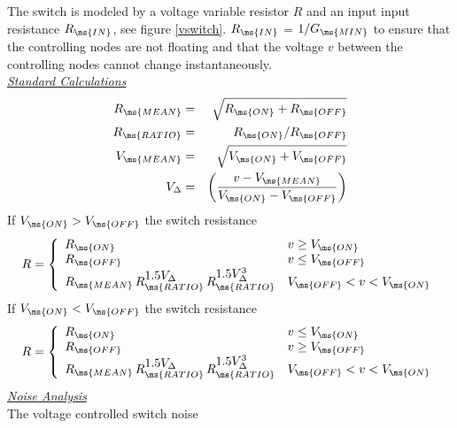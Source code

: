 The switch is modeled by a voltage variable resistor $R$ and an
input input resistance $R_{\ms{IN}}$, see figure \ref{vswitch}.
$R_{\ms{IN}}$ = $1/G_{\ms{MIN}}$ to ensure that the controlling
nodes are not floating and that the voltage $v$ between the
controlling nodes cannot change instantaneously.\\[0.1in]

\noindent\underline{\sl \large Standard Calculations}\\[0.1in]
\begin{eqnarray}
R_{\ms{MEAN}} & = & \sqrt{R_{\ms{ON}} + R_{\ms{OFF}}} \\
R_{\ms{RATIO}}& = &       R_{\ms{ON}}/ R_{\ms{OFF}} \\
V_{\ms{MEAN}} & = & \sqrt{V_{\ms{ON}} + V_{\ms{OFF}}} \\
V_{\Delta}& = & \left({{\textstyle v - V_{\ms{MEAN}}} \over
              {\textstyle V_{\ms{ON}}- V_{\ms{OFF}}}}\right)
\end{eqnarray}
If $V_{\ms{ON}}> V_{\ms{OFF}}$ the switch resistance
\begin{equation}
R = \left\{
\begin{array}{ll}
R_{\ms{ON}}                            & v \ge V_{\ms{ON}} \\
R_{\ms{OFF}}                            & v \le V_{\ms{OFF}}\\
R_{\ms{MEAN}}\,
  R_{\ms{RATIO}}^{\textstyle 1.5 V_{\Delta}}\,
  R_{\ms{RATIO}}^{\textstyle 1.5 V_{\Delta}^3}
  & V_{\ms{OFF}} < v < V_{\ms{ON}} \\
\end{array} \right. %
\end{equation}
If $V_{\ms{ON}}< V_{\ms{OFF}}$ the switch resistance
\begin{equation}
R = \left\{
\begin{array}{ll}
R_{\ms{ON}}                            & v \le V_{\ms{ON}} \\
R_{\ms{OFF}}                            & v \ge V_{\ms{OFF}}\\
R_{\ms{MEAN}}\,
  R_{\ms{RATIO}}^{\textstyle 1.5 V_{\Delta}}\,
  R_{\ms{RATIO}}^{\textstyle 1.5 V_{\Delta}^3}
  & V_{\ms{OFF}} < v < V_{\ms{ON}} \\
\end{array} \right. %
\end{equation}
\noindent\underline{\sl \large Noise Analysis}\\[0.1in]
 
 The voltage controlled switch noise
